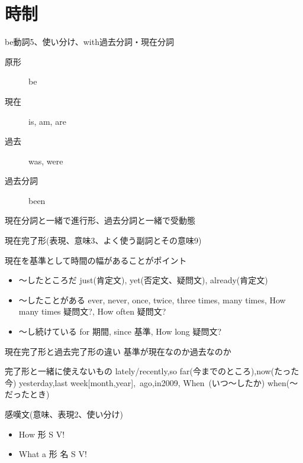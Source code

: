 \documentclass[10pt]{jsarticle}
\newcommand{\answer}[2]{{\color{orange}#2}}
\newcommand{\answer}[2]{\vspace{#1mm}}
\begin{document}
\newpage
\section{時制}
\begin{itembox}[l]{be動詞5、使い分け、with過去分詞・現在分詞}
	\answer{15}{
		\begin{multicols}{4}
			\begin{description}
				\item[原形] be
				\item[現在] is, am, are
				\item[過去] was, were
				\item[過去分詞] been
			\end{description}
		\end{multicols}

		現在分詞と一緒で進行形、過去分詞と一緒で受動態
	}
\end{itembox}

\begin{itembox}[l]{現在完了形(表現、意味3、よく使う副詞とその意味9)}
	\answer{20}{
		現在を基準として時間の幅があることがポイント
		\begin{itemize}
			\item 〜したところだ just(肯定文), yet(否定文、疑問文), already(肯定文)
			\item 〜したことがある ever, never, once, twice, three times, many times, How many times 疑問文?, How often 疑問文?
			\item 〜し続けている for 期間, since 基準, How long 疑問文?
		\end{itemize}
	}
\end{itembox}
\begin{itembox}[l]{現在完了形と過去完了形の違い}
	\answer{10}{基準が現在なのか過去なのか}
\end{itembox}
\begin{itembox}[l]{完了形と一緒に使えないもの}
	\answer{10}{lately/recently,so far(今までのところ),now(たった今) yesterday,last week[month,year],~ago,in2009, When~(いつ〜したか) when(〜だったとき) }
\end{itembox}

\begin{itembox}[l]{感嘆文(意味、表現2、使い分け)}
	\answer{10}{
		\begin{itemize}
			\item How 形 S V!
			\item What a 形 名 S V!
		\end{itemize}
	}
\end{itembox}
\end{document}
